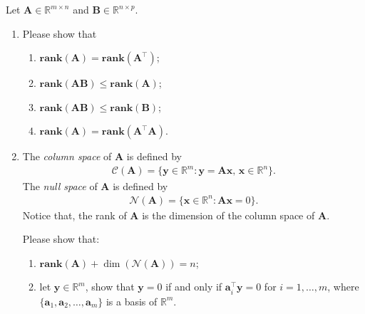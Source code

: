 \documentclass[11pt,letter,notitlepage]{article}
\newcommand{\rank}[1]{ \textbf{rank}  (#1)  }
\begin{document}
\begin{exercise}
	Let $\mathbf{A} \in \mathbb{R}^{m\times n}$ and $\mathbf{B}\in \mathbb{R}^{n\times p}$.
	\begin{enumerate}
		\item Please show that
		      \begin{enumerate}
			      \item $\rank{\mathbf{A}} = \rank{\mathbf{A}^{\top}}$;
			      \item $\rank{\mathbf{A}\mathbf{B}} \leq \rank{\mathbf{A}}$;
			      \item $\rank{\mathbf{A}\mathbf{B}} \leq \rank{\mathbf{B}}$;
			      \item $\rank{\mathbf{A}} = \rank{\mathbf{A}^{\top}  \mathbf{A}}$.
		      \end{enumerate}
		\item The \emph{column space} of $\mathbf{A}$ is defined by
		      \begin{align*}
			      \mathcal{C}(\mathbf{A} ) = \{ \mathbf{y}\in \mathbb{R}^m : \mathbf{y} = \mathbf{Ax},\,\mathbf{x}\in\mathbb{R}^n\}.
		      \end{align*}
		      The \emph{null space} of $\mathbf{A}$ is defined by
		      \begin{align*}
			      \mathcal{N}(\mathbf{A})  = \{ \mathbf{x}\in \mathbb{R}^n : \mathbf{Ax}=0\}.
		      \end{align*}
		      Notice that, the rank of $\mathbf{A}$ is the dimension of the column space of $\mathbf{A}$.

		      Please show that:
		      \begin{enumerate}
			      \item $\rank{\mathbf{A}} + \dim ( \mathcal{N}( \mathbf{A} ) ) = n$;
			      \item let $\mathbf{y}\in \mathbb{R}^m$, show that $\mathbf{y}=0$ if and only if $\mathbf{a}_i^{\top}\mathbf{y}=0$ for $i=1,\ldots,m$, where $\{\mathbf{a}_1,\mathbf{a}_2,\ldots,\mathbf{a}_m\}$ is a basis of $\mathbb{R}^m$.
		      \end{enumerate}
	\end{enumerate}
\end{exercise}
\end{document}
